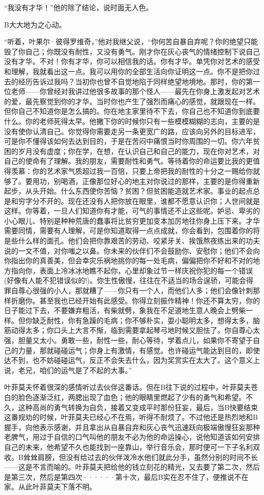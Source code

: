 \documentclass[12pt, UTF8]{ctexbook}
\begin{document}
\par “我没有才华！”他的除了结论，说时面无人色。
\par B大大地为之心动。
\par “听着，叶果尔·彼得罗维奇，”他对我继父说，“你何苦自暴自弃呢？你的绝望只能毁了你自己；你既没有耐性，又没有勇气。刚才你在灰心丧气的情绪控制下说自己没有才华。不对！你有才华，你可以相信我的话。你有才华。单凭你对艺术的感受和理解，我就看出这一点。我可以用你的全部生活向你证明这一点。你不是把你过去的经历告诉过我吗？当初你也曾不自觉地陷于同样绝望地境地。那时，你的第一位老师——你曾经对我讲过他很多故事的那个怪人——最先在你身上激发起对艺术的爱，最先察觉到你的才华。当时你也产生了强烈而痛心的感觉，就跟现在一样。但你自己不知道你是怎么搞的。你在地主家里待不下去，你自己也不知道你到底要什么。你的老师死得太早。他撇下你的时候你只有一些模模糊糊的志向，主要的是没有使你认清自己。你觉得你需要走另一条更宽广的路，应该向另外的目标进军，可是你不懂得该如何去达到目的，于是在苦闷中痛恨当时你周围的一切。你六年贫困的岁月没有虚度；你在学，在想，在认识自己和自己的能力，现在你对艺术，对自己的使命有了理解。我的朋友，需要耐性和勇气。等待着你的命运要比我的更值得羡慕：你的艺术家气质超过我一百倍，只要上帝把我的耐性的十分之一赐给你就够了。要用功，别喝酒，正像那位好心的地主对你说过的那样，主要的是你得重新起步，从头开始。什么东西使你苦恼？贫困？但贫困能造就艺术家。事业的起点总是和穷字分不开的。现在还没有人把你放在眼里，谁都不愿意认识你；人世间就是这样。你等着，一旦人们知道你有才能，可气的事情还不止这些呢。妒忌、卑劣的小心眼儿、特别是种种荒唐的蠢事将比贫穷更加变本加厉地往你身上压下来。才华需要同情，需要有人理解，可是你知道取得一点点成就，你会看到，包围着你的将是些什么样的面孔。他们会把你靠艰苦的劳动、咬紧牙关、挨饿熬夜练出来的功夫说的一文不值，对你嗤之以鼻。你未来的伙伴们不会鼓励你、安慰你；他们不会向你指出你的真善美，但会幸灾乐祸地挑你的每一处毛病，偏偏把你不好和不对的地方指向你，表面上冷冰冰地瞧不起你，心里却象过节一样庆祝你犯的每一个错误(好像有人能不犯错误似的!)。你生性傲慢，往往在不适当的场合逞骄，可能会得罪自尊心很强的小人，那就糟了——你只有一个人，而他们人多；他们会像针刺那样折磨你。甚至我也已经开始有此感受。你得立刻振作精神！你还不算太穷，你的日子能过下去，不要嫌弃粗活，有柴就劈，象我在不足道地生意人晚会上劈柴一样。但你缺乏耐性，你有急躁的毛病；你不够朴实，耍小聪明太多，想得太多，脑筋动得太多；你口头上大言不惭，临到需要拿起琴弓地时候又胆怯了。你自尊心太强，胆量又太小。勇敢一些，耐性一些，耐心等待，学着点儿，如果你不寄望于自己的力量，那就碰碰运气；你身上有激情，有感觉。也许碰运气能达到目的，即使达不到，也不妨碰碰运气，反正不会失去什么，因为奖赏实在太大了。这个意义上说，老兄，咱们的运气是了不起的大事。”
\par 叶菲莫夫怀着很深的感情听过去伙伴这番话。但在B往下说的过程中，叶菲莫夫苍白的脸色逐渐泛红，两腮出现了血色；他的眼睛里燃起了少有的勇气和希望。不久，这种高尚的勇气转换为自负，接着又变成平时那份狂妄，最后，当B快要结束这番规劝的时候，叶菲莫夫已经心不在焉，听得不耐烦了。不过他还是热烈地和B握手，向他表示感谢，并且拿出从自暴自弃和灰心丧气迅速跃向极端傲慢狂妄那种老脾气，用过于自信的口气叫他的朋友不必为他的命运操心，说他知道该如何安排自己的未来，他希望不久也能找到一座靠山，举行音乐会，那时便可一下子名利双收。B耸耸肩膀，但没有给过去的伙伴泼冷水他们就此分手，虽然分别的时间不长——这是不言而喻的。叶菲莫夫把给他的钱立刻花的精光，又去要了第二次，然后是第三次，然后是第四次······第十次，最后B实在忍不住了，便推说不在家。从此叶菲莫夫下落不明。
\end{document}
